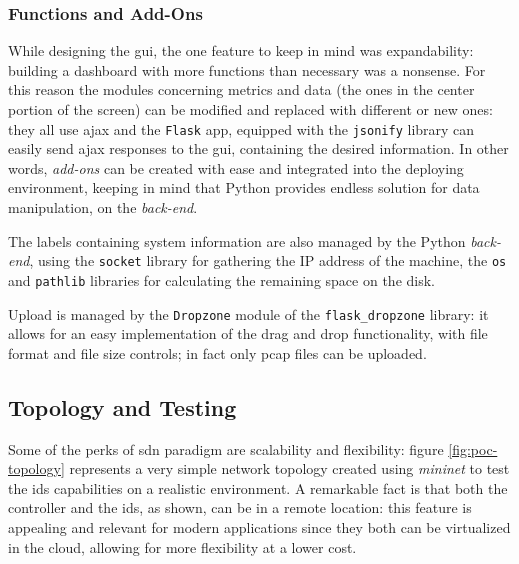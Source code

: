 \subsubsection{Functions and Add-Ons}
\label{subsubsec:functions}

While designing the \gls{gui}, the one feature to keep in mind was expandability: building a dashboard with more functions than necessary was a nonsense. For this reason the modules concerning metrics and data (the ones in the center portion of the screen) can be modified and replaced with different or new ones: they all use \gls{ajax} and the \texttt{Flask} app, equipped with the \texttt{jsonify} library can easily send \gls{ajax} responses to the \gls{gui}, containing the desired information. In other words, \textit{add-ons} can be created with ease and integrated into the deploying environment, keeping in mind that Python provides endless solution for data manipulation, on the \textit{back-end}.
\par The labels containing system information are also managed by the Python \textit{back-end}, using the \texttt{socket} library for gathering the IP address of the machine, the \texttt{os} and \texttt{pathlib} libraries for calculating the remaining space on the disk.
\par Upload is managed by the \texttt{Dropzone} module of the \texttt{flask\_dropzone} library: it allows for an easy implementation of the drag and drop functionality, with file format and file size controls; in fact only \gls{pcap} files can be uploaded.


\subsection{Topology and Testing}
\label{subsec:topology}

Some of the perks of \gls{sdn} paradigm are scalability and flexibility: figure \ref{fig:poc-topology} represents a very simple network topology created using \textit{mininet} to test the \gls{ids} capabilities on a realistic environment. A remarkable fact is that both the controller and the \gls{ids}, as shown, can be in a remote location: this feature is appealing and relevant for modern applications since they both can be virtualized in the cloud, allowing for more flexibility at a lower cost.

